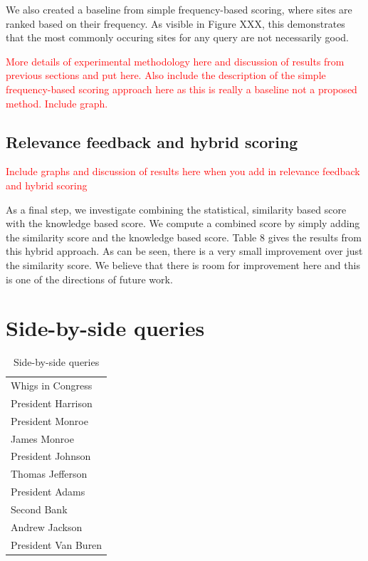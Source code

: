 \documentclass[pdfpagelabels=false,plainpages=true]{acm_proc_article-sp}
\begin{document}
We also created a baseline from simple frequency-based scoring, where
sites are ranked based on their frequency. As visible in Figure XXX, this demonstrates that the
most commonly occuring sites for any query are not necessarily good. 

\textcolor{red}{More details of experimental methodology here and discussion
  of results from previous sections and put here. Also include the description
  of the simple frequency-based scoring approach here as this is really a baseline
  not a proposed method. Include graph.}  

\subsection{Relevance feedback and hybrid scoring}

\textcolor{red}{Include graphs and discussion of results here when you add in
  relevance feedback and hybrid scoring}

As a final step, we investigate combining the statistical, similarity based
score with the knowledge based score. We compute a combined score by simply
adding the similarity score and the knowledge based score. Table 8 gives the
results from this hybrid approach. As can be seen, there is a very small
improvement over just the similarity score. We believe that there is room for
improvement here and this is one of the directions of future work. 




\appendix
\section{Side-by-side queries}
\label{app-queries}
\begin{table}
\begin{center}
\begin{tabular}{|l|} \hline
Whigs in Congress \\
President Harrison \\
President Monroe \\
James Monroe \\
President Johnson \\
Thomas Jefferson \\
President Adams \\
Second Bank \\
Andrew Jackson \\
President Van Buren \\
\hline\end{tabular}
\caption{Side-by-side queries}
\end{center}
\end{table}
\end{document}
